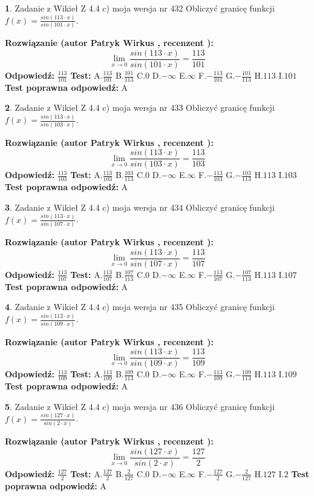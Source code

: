 \documentclass[12pt, a4paper]{article}
\theoremstyle{definition} %
\newtheorem{zad}{}
\newcommand{\zadStart}[1]{\begin{zad}#1\newline}
\newcommand{\zadStop}{\end{zad}}
\newcommand{\rozwStart}[2]{\noindent \textbf{Rozwiązanie (autor #1 , recenzent #2): }\newline}
\newcommand{\rozwStop}{\newline}
\newcommand{\odpStart}{\noindent \textbf{Odpowiedź:}\newline}
\newcommand{\odpStop}{\newline}
\newcommand{\testStart}{\noindent \textbf{Test:}\newline}
\newcommand{\testStop}{\newline}
\newcommand{\kluczStart}{\noindent \textbf{Test poprawna odpowiedź:}\newline}
\newcommand{\kluczStop}{\newline}
\begin{document}
\zadStart{Zadanie z Wikieł Z 4.4 c) moja wersja nr 432}
Obliczyć granicę funkcji $f(x)=\frac{sin(113\cdot x)}{sin(101\cdot x)}$.
\zadStop
\rozwStart{Patryk Wirkus}{}
$$\lim\limits_{x\to 0}\frac{sin(113\cdot x)}{sin(101\cdot x)}=
\frac{113}{101}$$
\rozwStop
\odpStart
$\frac{113}{101}$
\odpStop
\testStart
A.$\frac{113}{101}$
B.$\frac{101}{113}$
C.$0$
D.$-\infty$
E.$\infty$
F.$-\frac{113}{101}$
G.$-\frac{101}{113}$
H.$113$
I.$101$
\testStop
\kluczStart
A
\kluczStop



\zadStart{Zadanie z Wikieł Z 4.4 c) moja wersja nr 433}
Obliczyć granicę funkcji $f(x)=\frac{sin(113\cdot x)}{sin(103\cdot x)}$.
\zadStop
\rozwStart{Patryk Wirkus}{}
$$\lim\limits_{x\to 0}\frac{sin(113\cdot x)}{sin(103\cdot x)}=
\frac{113}{103}$$
\rozwStop
\odpStart
$\frac{113}{103}$
\odpStop
\testStart
A.$\frac{113}{103}$
B.$\frac{103}{113}$
C.$0$
D.$-\infty$
E.$\infty$
F.$-\frac{113}{103}$
G.$-\frac{103}{113}$
H.$113$
I.$103$
\testStop
\kluczStart
A
\kluczStop



\zadStart{Zadanie z Wikieł Z 4.4 c) moja wersja nr 434}
Obliczyć granicę funkcji $f(x)=\frac{sin(113\cdot x)}{sin(107\cdot x)}$.
\zadStop
\rozwStart{Patryk Wirkus}{}
$$\lim\limits_{x\to 0}\frac{sin(113\cdot x)}{sin(107\cdot x)}=
\frac{113}{107}$$
\rozwStop
\odpStart
$\frac{113}{107}$
\odpStop
\testStart
A.$\frac{113}{107}$
B.$\frac{107}{113}$
C.$0$
D.$-\infty$
E.$\infty$
F.$-\frac{113}{107}$
G.$-\frac{107}{113}$
H.$113$
I.$107$
\testStop
\kluczStart
A
\kluczStop



\zadStart{Zadanie z Wikieł Z 4.4 c) moja wersja nr 435}
Obliczyć granicę funkcji $f(x)=\frac{sin(113\cdot x)}{sin(109\cdot x)}$.
\zadStop
\rozwStart{Patryk Wirkus}{}
$$\lim\limits_{x\to 0}\frac{sin(113\cdot x)}{sin(109\cdot x)}=
\frac{113}{109}$$
\rozwStop
\odpStart
$\frac{113}{109}$
\odpStop
\testStart
A.$\frac{113}{109}$
B.$\frac{109}{113}$
C.$0$
D.$-\infty$
E.$\infty$
F.$-\frac{113}{109}$
G.$-\frac{109}{113}$
H.$113$
I.$109$
\testStop
\kluczStart
A
\kluczStop



\zadStart{Zadanie z Wikieł Z 4.4 c) moja wersja nr 436}
Obliczyć granicę funkcji $f(x)=\frac{sin(127\cdot x)}{sin(2\cdot x)}$.
\zadStop
\rozwStart{Patryk Wirkus}{}
$$\lim\limits_{x\to 0}\frac{sin(127\cdot x)}{sin(2\cdot x)}=
\frac{127}{2}$$
\rozwStop
\odpStart
$\frac{127}{2}$
\odpStop
\testStart
A.$\frac{127}{2}$
B.$\frac{2}{127}$
C.$0$
D.$-\infty$
E.$\infty$
F.$-\frac{127}{2}$
G.$-\frac{2}{127}$
H.$127$
I.$2$
\testStop
\kluczStart
A
\kluczStop
\end{document}
